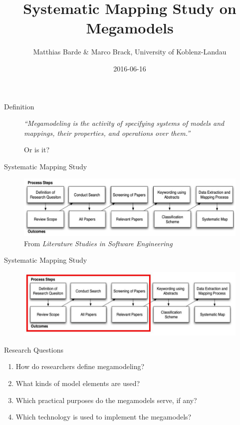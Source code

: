 \documentclass{beamer}
\title[Summary]{Systematic Mapping Study on Megamodels}
\author{Matthias Barde \& Marco Brack, University of Koblenz-Landau}
\institute{SLE course SS 2016 (\url{http://www.softlang.org/course:sle16})}
\date{2016-06-16}
\begin{document}
\begin{frame}
\titlepage
\end{frame}


\begin{frame}{Definition}
\begin{figure}
  \textit{``Megamodeling is the activity of specifying systems of models and mappings, their properties, and operations over them.''} \cite{diskin2013mapping}

  \pause
  \vspace{1cm}
  Or is it?
\end{figure}
\end{frame}


\begin{frame}{Systematic Mapping Study}
\begin{figure}
	\includegraphics[width=1.0\textwidth]{sms_full}
	\caption{From \textit{Literature Studies in Software Engineering} \cite{litstud}}
\end{figure}
\end{frame}

\begin{frame}{Systematic Mapping Study}
\begin{figure}
	\includegraphics[width=1.0\textwidth]{sms_part_marked}
\end{figure}
\end{frame}

\begin{frame}{Research Questions}
\begin{enumerate}
	\item How do researchers define megamodeling?
	\item What kinds of model elements are used?
	\item Which practical purposes do the megamodels serve, if any?
	\item Which technology is used to implement the megamodels?
\end{enumerate}
\end{frame}
\end{document}
